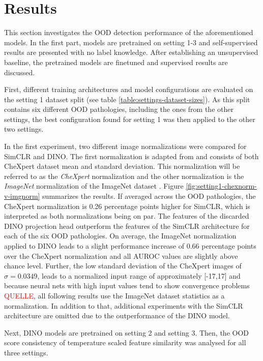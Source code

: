 \section{Results}
This section investigates the OOD detection performance of the aforementioned models.
In the first part, models are pretrained on setting 1-3 and self-supervised results are presented with no label knowledge.
After establishing an unsupervised baseline, the pretrained models are finetuned and supervised results are discussed.
\par
First, different training architectures and model configurations are evaluated on the setting 1 dataset split (see table \ref{table:settings-dataset-sizes}).
As this split contains six different OOD pathologies, including the ones from the other settings, the best configuration found for setting 1 was then applied to the other two settings.
\par
In the first experiment, two different image normalizations were compared for SimCLR and DINO.
The first normalization is adapted from \citep{Berger2021} and consists of both CheXpert dataset mean and standard deviation.
This normalization will be referred to as the \textit{CheXpert} normalization and the other normalization is the \textit{ImageNet} normalization of the ImageNet dataset \citep{Deng2009}.
Figure \ref{fig:setting1-chexnorm-v-imgnorm} summarizes the results.
If averaged across the OOD pathologies, the CheXpert normalization is 0.26 percentage points higher for SimCLR, which is interpreted as both normalizations being on par.
The features of the discarded DINO projection head outperform the features of the SimCLR architecture for each of the six OOD pathologies.
On average, the ImageNet normalization applied to DINO leads to a slight performance increase of 0.66 percentage points over the CheXpert normalization and all AUROC values are slightly above chance level.
Further, the low standard deviation of the CheXpert images of $\sigma=0.0349$, leads to a normalized input range of approximately [-17,17] and because neural nets with high input values tend to show convergence problems \textcolor{red}{QUELLE}, all following results use the ImageNet dataset statistics as a normalization.
In addition to that, additional experiments with the SimCLR architecture are omitted due to the outperformance of the DINO model.
\par
{}
Next, DINO models are pretrained on setting 2 and setting 3.
Then, the OOD score consistency of temperature scaled feature similarity was analysed for all three settings.
